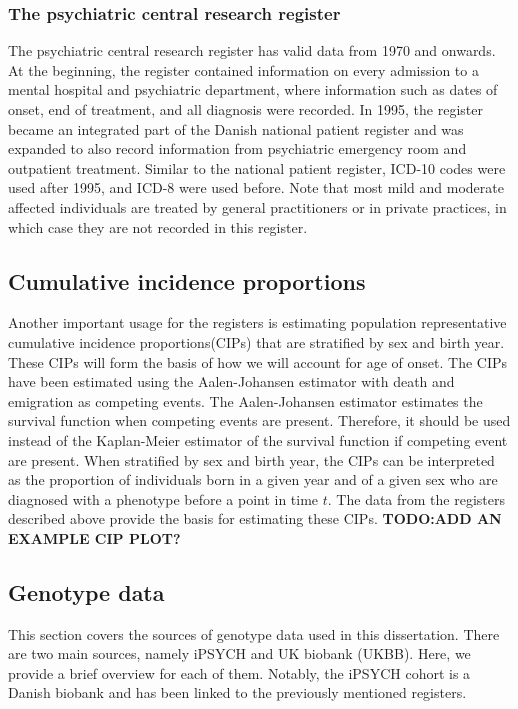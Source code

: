 \subsubsection{The psychiatric central research register}
The psychiatric central research register has valid data from 1970 and onwards. At the beginning, the register contained information on every admission to a mental hospital and psychiatric department, where information such as dates of onset, end of treatment, and all diagnosis were recorded. In 1995, the register became an integrated part of the Danish national patient register and was expanded to also record information from psychiatric emergency room and outpatient treatment. Similar to the national patient register, ICD-10 codes were used after 1995, and ICD-8 were used before. Note that most mild and moderate affected individuals are treated by general practitioners or in private practices, in which case they are not recorded in this register.\cite{mors2011danish}


\subsection{Cumulative incidence proportions}
Another important usage for the registers is estimating population representative cumulative incidence proportions(CIPs) that are stratified by sex and birth year. These CIPs will form the basis of how we will account for age of onset. The CIPs have been estimated using the Aalen-Johansen estimator\cite{hansen2017estimating} with death and emigration as competing events. The Aalen-Johansen estimator estimates the survival function when competing events are present. Therefore, it should be used instead of the Kaplan-Meier estimator of the survival function if competing event are present. When stratified by sex and birth year, the CIPs can be interpreted as the proportion of individuals born in a given year and of a given sex who are diagnosed with a phenotype before a point in time $ t $. The data from the registers described above provide the basis for estimating these CIPs.
\textbf{TODO:ADD AN EXAMPLE CIP PLOT?}



\subsection{Genotype data}
This section covers the sources of genotype data used in this dissertation. There are two main sources, namely iPSYCH and UK biobank (UKBB). Here, we provide a brief overview for each of them. Notably, the iPSYCH cohort is a Danish biobank and has been linked to the previously mentioned registers. 

